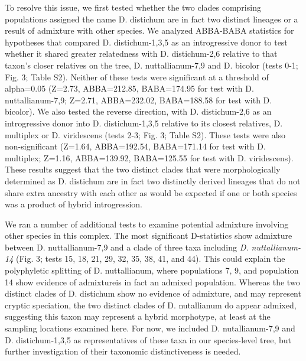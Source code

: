 \documentclass[11pt]{article}
\begin{document}
To resolve this issue, we first tested whether the two clades comprising populations assigned the name D. distichum are in fact two distinct lineages or a result of admixture with other species. We analyzed ABBA-BABA statistics for hypotheses that compared D. distichum-1,3,5 as an introgressive donor to test whether it shared greater relatedness with D. distichum-2,6 relative to that taxon’s closer relatives on the tree, D. nuttallianum-7,9 and D. bicolor (tests 0-1; Fig. 3; Table S2). Neither of these tests were significant at a threshold of alpha=0.05 (Z=2.73, ABBA=212.85, BABA=174.95 for test with D. nuttallianum-7,9; Z=2.71, ABBA=232.02, BABA=188.58 for test with D. bicolor). We also tested the reverse direction, with D. distichum-2,6 as an introgressive donor into D. distichum-1,3,5 relative to its closest relatives, D. multiplex or D. viridescens (tests 2-3; Fig. 3; Table S2). These tests were also non-significant (Z=1.64, ABBA=192.54, BABA=171.14 for test with D. multiplex; Z=1.16, ABBA=139.92, BABA=125.55 for test with D. viridescens). These results suggest that the two distinct clades that were morphologically determined as D. distichum are in fact two distinctly derived lineages that do not share extra ancestry with each other as would be expected if one or both species was a product of hybrid introgression.


We ran a number of additional tests to examine potential admixture involving other species in this complex. The most significant D-statistics show admixture between D. nuttallianum-7,9 and  a clade of three taxa including \emph{D. nuttallianum-14} (Fig. 3; tests 15, 18, 21, 29, 32, 35, 38, 41, and 44). This could explain the polyphyletic splitting of D. nuttallianum, where populations 7, 9, and population 14 show evidence of admixtureis in fact an admixed population. Whereas the two distinct clades of D. distichum show no evidence of admixture, and may represent cryptic speciation, the two distinct clades of D. nutallianum do appear admixed, suggesting this taxon may represent a hybrid morphotype, at least at the sampling locations examined here. For now, we included D. nutallianum-7,9 and D. distichum-1,3,5 as representatives of these taxa in our species-level tree, but further investigation of their taxonomic distinctiveness is needed.
\end{document}
